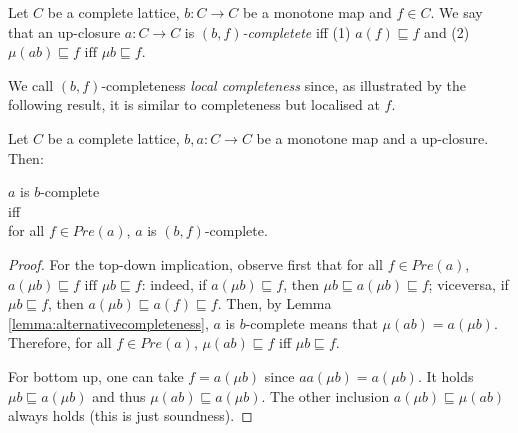 \documentclass{llncs}
\begin{document}
\medskip

\begin{definition}
Let $C$ be a complete lattice, $b\colon C \to C$ be a monotone map and $f\in C$. We say that an up-closure $a\colon C \to C$ is \emph{$(b,f)$-completete} iff
(1) $a(f)\sqsubseteq f $  and (2) $ \mu (a b) \sqsubseteq f \text{ iff } \mu b \sqsubseteq f$.
\end{definition}
We call $(b,f)$-completeness \emph{local completeness} since, as illustrated by the following result, it is similar to completeness but localised at $f$.
\begin{proposition}
Let $C$ be a complete lattice, $b,a\colon C \to C$ be a monotone map and a up-closure.
Then:
\begin{center}
$a$ is $b$-complete \\ iff \\ for all $f\in Pre(a)$, $a$ is $(b,f)$-complete. 
\end{center}
\end{proposition}
\begin{proof}
For the top-down implication, observe first that for all $f\in Pre(a)$, $a(\mu b) \sqsubseteq f \text{ iff } \mu b \sqsubseteq f$: indeed, 
if $a(\mu b) \sqsubseteq f$, then $\mu b \sqsubseteq a(\mu b) \sqsubseteq f$;
%
viceversa, if $\mu b \sqsubseteq f$, then $a(\mu b) \sqsubseteq a(f) \sqsubseteq f$. Then, by Lemma \ref{lemma:alternativecompleteness}, $a$ is $b$-complete means that $\mu (ab)=a(\mu b)$. Therefore, for all $f\in Pre(a)$, $\mu (ab) \sqsubseteq f$ iff $\mu b \sqsubseteq f$.

 For bottom up, one can take $f=a(\mu b)$ since $aa(\mu b)=a(\mu b)$. It holds $\mu b \sqsubseteq a(\mu b)$ and thus $\mu(ab) \sqsubseteq a(\mu b)$. The other inclusion $a(\mu b) \sqsubseteq \mu(ab)$ always holds (this is just soundness).
\end{proof}



%
%
%
%
\end{document}
